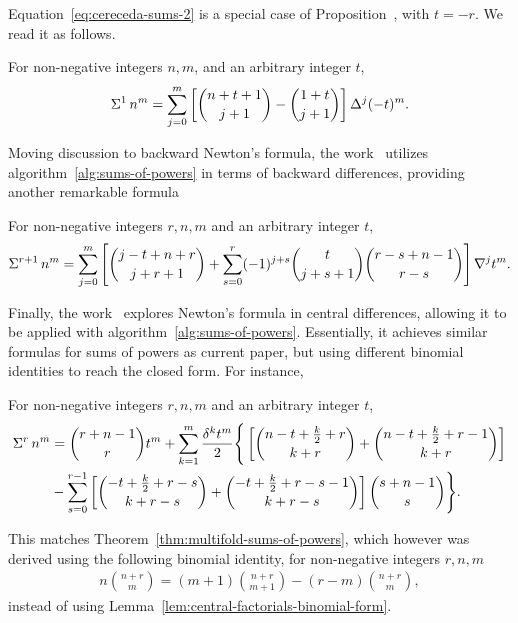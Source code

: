 Equation~\eqref{eq:cereceda-sums-2} is a special case
of Proposition~\cite[Proposition (1.8)]{kolosov_2026_forward}, with $t=-r$.
We read it as follows.
\begin{proposition}
  For non-negative integers $n,m$, and an arbitrary integer $t$,
  \begin{align*}
    \Sigma^{1}\,{n}^{m} = \sum_{j=0}^{m}
    \left[ \binom{n+t+1}{j+1} - \binom{1+t}{j+1} \right] \Delta^{j} (-t)^m.
  \end{align*}
\end{proposition}
Moving discussion to backward Newton's formula, the work~\cite{kolosov_2026_backward}
utilizes algorithm~\eqref{alg:sums-of-powers} in terms of backward differences,
providing another remarkable formula
\begin{proposition}
  For non-negative integers $r,n,m$ and an arbitrary integer $t$,
  \begin{align*}
    \Sigma^{r+1}\,{n}^{m} = \sum_{j=0}^{m}
    \left[
      \binom{j-t+n+r}{j+r+1}
      + \sum_{s=0}^{r} (-1)^{j+s} \binom{t}{j+s+1} \binom{r-s+n-1}{r-s}
    \right] \nabla^{j} t^{m}.
  \end{align*}
\end{proposition}
Finally, the work~\cite{kolosov_2026_central} explores Newton's formula
in central differences, allowing it to be applied with algorithm~\eqref{alg:sums-of-powers}.
Essentially, it achieves similar formulas for sums of powers as current paper,
but using different binomial identities to reach the closed form.
For instance,
\begin{proposition}
  For non-negative integers $r,n,m$ and an arbitrary integer $t$,
  \begin{align*}
    \Sigma^{r}\,{n}^{m}
    &= \binom{r+n-1}{r} t^m
    + \sum_{k=1}^{m} \frac{\delta^{k} t^{m}}{2}
    \Bigg \{
      \left[
        \binom{n-t+\frac{k}{2}+r}{k+r}
        +
        \binom{n-t+\frac{k}{2}+r-1}{k+r}
      \right] \\
      &-
      \sum_{s=0}^{r-1}
      \left[
        \binom{-t+\frac{k}{2} + r -s}{k+r-s} +
        \binom{-t+\frac{k}{2} + r -s-1}{k+r-s}
      \right] \binom{s+n-1}{s}
    \Bigg \}.
  \end{align*}
\end{proposition}
This matches Theorem~\eqref{thm:multifold-sums-of-powers}, which however was derived using
the following binomial identity, for non-negative integers $r,n,m$
\begin{align*}
  n \binom{n+r}{m} = (m+1) \binom{n+r}{m+1} - (r-m) \binom{n+r}{m},
\end{align*}
instead of using Lemma~\eqref{lem:central-factorials-binomial-form}.
